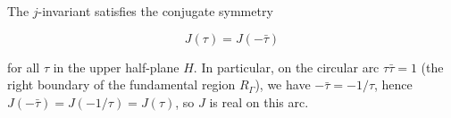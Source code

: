 The $j$-invariant satisfies the conjugate symmetry

$$J(\tau) = J(-\bar{\tau})$$

for all $\tau$ in the upper half-plane $H$. In particular, on the circular arc $\tau \bar{\tau} = 1$ (the right boundary of the fundamental region $R_{\Gamma}$), we have $-\bar{\tau} = -1/\tau$, hence $J(-\bar{\tau}) = J(-1/\tau) = J(\tau)$, so $J$ is real on this arc.
